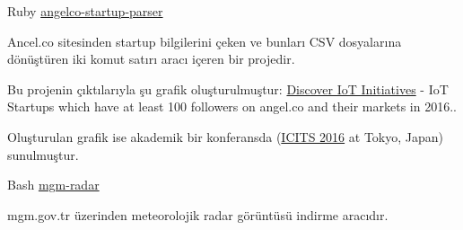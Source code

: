 
\begin{cventries}
  \cventry
    {Ruby} %
    {\href{https://github.com/erenhatirnaz/angelco-startup-parser}{angelco-startup-parser}} %
    {} %
    {} %
    {
      \begin{cvitems} %
        \item {Ancel.co sitesinden startup bilgilerini çeken ve bunları CSV
        dosyalarına dönüştüren iki komut satırı aracı içeren bir projedir.}
		    \item {Bu projenin çıktılarıyla şu grafik
        oluşturulmuştur: \href{https://graphcommons.com/graphs/8da5327d-7829-4dfe-b60b-4c0bda956b2a}{Discover
        IoT Initiatives} - IoT Startups which have at least 100 followers on
        angel.co and their markets in 2016..}
        \item Oluşturulan grafik ise akademik bir konferansda
        (\href{http://www.icits.org/}{ICITS 2016} at Tokyo, Japan) sunulmuştur.
\end{cvitems}
    }

  \cventry
    {Bash} %
    {\href{https://github.com/erenhatirnaz/mgm-radar}{mgm-radar}} %
    {} %
    {} %
    {
      \begin{cvitems} %
      	\item {mgm.gov.tr üzerinden meteorolojik radar görüntüsü indirme aracıdır.}
      \end{cvitems}
    }
\end{cventries}
